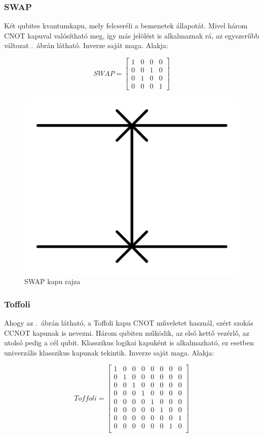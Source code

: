 \documentclass[
]{thesis-ekf}
\theoremstyle{definition}
\theoremstyle{remark}
\begin{document}
\subsubsection{SWAP}
Két qubites kvantumkapu, mely felcseréli a bemenetek állapotát. Mivel három CNOT kapuval valósítható meg, így más jelölést is alkalmaznak rá, az egyszerűbb változat \az{\ref{fig:swap}}.~ábrán látható. Inverze saját maga. Alakja:

\begin{equation}
	SWAP= 
	\begin{bmatrix}
		1 & 0 & 0 & 0\\
		0 & 0 & 1 & 0\\
		0 & 1 & 0 & 0\\
		0 & 0 & 0 & 1
	\end{bmatrix}
\end{equation}

\begin{figure}[H]
	\centering
	\includegraphics[width=0.25\linewidth]{SWAP}
	\caption{SWAP kapu rajza}
	\label{fig:swap}
\end{figure}


\subsubsection{Toffoli}
Ahogy az \az{\ref{fig:toffoligate}}.~ábrán látható, a Toffoli kapu CNOT műveletet használ, ezért szokás CCNOT kapunak is nevezni. Három qubiten működik, az első kettő vezérlő, az utolsó pedig a cél qubit. Klasszikus logikai kapuként is alkalmazható, ez esetben univerzális klasszikus kapunak tekintik. Inverze saját maga. Alakja:

\begin{equation}
	Toffoli= 
	\begin{bmatrix}
		1 & 0 & 0 & 0 & 0 & 0 & 0 & 0\\
		0 & 1 & 0 & 0 & 0 & 0 & 0 & 0\\
		0 & 0 & 1 & 0 & 0 & 0 & 0 & 0\\
		0 & 0 & 0 & 1 & 0 & 0 & 0 & 0\\
		0 & 0 & 0 & 0 & 1 & 0 & 0 & 0\\
		0 & 0 & 0 & 0 & 0 & 1 & 0 & 0\\
		0 & 0 & 0 & 0 & 0 & 0 & 0 & 1\\
		0 & 0 & 0 & 0 & 0 & 0 & 1 & 0\\
	\end{bmatrix}
\end{equation}
\end{document}
